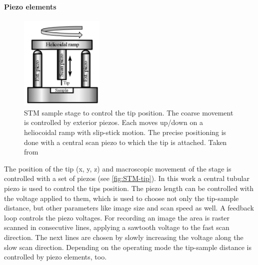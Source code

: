 \paragraph{Piezo elements}
\begin{figure} \centering
	\includegraphics[width=4cm]{./images/STM-sketch-2}
	\caption{STM sample stage to control the tip position. The coarse movement is controlled by exterior piezos. Each moves up/down on a heliocoidal ramp with slip-stick motion. The precise positioning is done with a central scan piezo to which the tip is attached. Taken from}
	\label{fig:stm-heliocoidal ramp}
\end{figure}
The position of the tip (x, y, z) and macroscopic movement of the stage is controlled with a set of piezos (see \textcolor{red}{\autoref{fig:STM-tip}}). In this work a central tubular piezo is used to control the tips position. The piezo length can be controlled with the voltage applied to them, which is used to choose not only the tip-sample distance, but other parameters like image size and scan speed as well. A feedback loop controls the piezo voltages. For recording an image the area is raster scanned in consecutive lines, applying a sawtooth voltage to the fast scan direction. The next lines are chosen by slowly increasing the voltage along the slow scan direction. Depending on the operating mode the tip-sample distance is controlled by piezo elements, too.


